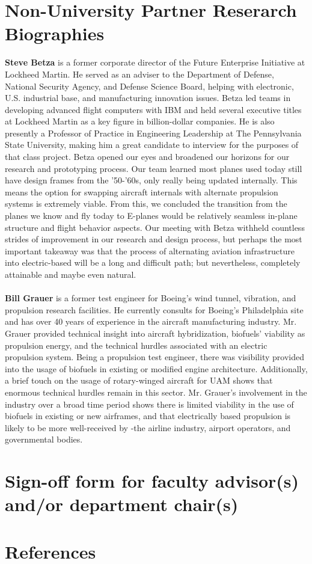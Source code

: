 \documentclass{article}
\begin{document}
\section{Non-University Partner Reserarch Biographies}\label{apxC}
\begin{singlespace}
\noindent\textbf{Steve Betza} is a former corporate director of the Future Enterprise Initiative at Lockheed Martin. He served as an adviser to the Department of Defense, National Security Agency, and Defense Science Board, helping with electronic, U.S. industrial base, and manufacturing innovation issues. Betza led teams in developing advanced flight computers with IBM and held several executive titles at Lockheed Martin as a key figure in billion-dollar companies. He is also presently a Professor of Practice in Engineering Leadership at The Pennsylvania State University, making him a great candidate to interview for the purposes of that class project. Betza opened our eyes and broadened our horizons for our research and prototyping process. Our team learned most planes used today still have design frames from the '50-'60s, only really being updated internally. This means the option for swapping aircraft internals with alternate propulsion systems is extremely viable. From this, we concluded the transition from the planes we know and fly today to E-planes would be relatively seamless in-plane structure and flight behavior aspects. Our meeting with Betza withheld countless strides of improvement in our research and design process, but perhaps the most important takeaway was that the process of alternating aviation infrastructure into electric-based will be a long and difficult path; but nevertheless, completely attainable and maybe even natural.\\~\\
\noindent\textbf{Bill Grauer} is a former test engineer for Boeing’s wind tunnel, vibration, and propulsion research facilities. He currently consults for Boeing’s Philadelphia site and has over 40 years of experience in the aircraft manufacturing industry. Mr. Grauer provided technical insight into aircraft hybridization, biofuels' viability as propulsion energy, and the technical hurdles associated with an electric propulsion system. Being a propulsion test engineer, there was visibility provided into the usage of biofuels in existing or modified engine architecture. Additionally, a brief touch on the usage of rotary-winged aircraft for UAM shows that enormous technical hurdles remain in this sector. Mr. Grauer’s involvement in the industry over a broad time period shows there is limited viability in the use of biofuels in existing or new airframes, and that electrically based propulsion is likely to be more well-received by -the airline industry, airport operators, and governmental bodies. 

\end{singlespace}
\section{Sign-off form for faculty advisor(s) and/or department chair(s)}\label{apxD}
\section{References}
\printbibliography[heading = none]
\cite{fuelSpecs}
\end{document}
